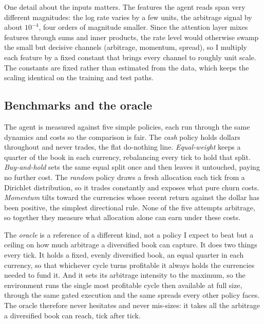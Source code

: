 \documentclass[12pt,a4paper]{article}
\begin{document}
One detail about the inputs matters. The features the agent reads span very different magnitudes:
the log rate varies by a few units, the arbitrage signal by about $10^{-4}$, four orders of
magnitude smaller. Since the attention layer mixes features through sums and inner products, the
rate level would otherwise swamp the small but decisive channels (arbitrage, momentum, spread),
so I multiply each feature by a fixed constant that brings every channel to roughly unit scale.
The constants are fixed rather than estimated from the data, which keeps the scaling identical on
the training and test paths.

\subsection{Benchmarks and the oracle}

The agent is measured against five simple policies, each run through the same dynamics and costs
so the comparison is fair. The \emph{cash} policy holds dollars throughout and never trades, the
flat do-nothing line. \emph{Equal-weight} keeps a quarter of the book in each currency,
rebalancing every tick to hold that split. \emph{Buy-and-hold} sets the same equal split once and
then leaves it untouched, paying no further cost. The \emph{random} policy draws a fresh
allocation each tick from a Dirichlet distribution, so it trades constantly and exposes what pure
churn costs. \emph{Momentum} tilts toward the currencies whose recent return against the dollar
has been positive, the simplest directional rule. None of the five attempts arbitrage, so
together they measure what allocation alone can earn under these costs.

The \emph{oracle} is a reference of a different kind, not a policy I expect to beat but a ceiling
on how much arbitrage a diversified book can capture. It does two things every tick. It holds a
fixed, evenly diversified book, an equal quarter in each currency, so that whichever cycle turns
profitable it always holds the currencies needed to fund it. And it sets its arbitrage intensity
to the maximum, so the environment runs the single most profitable cycle then available at full
size, through the same gated execution and the same spreads every other policy faces. The oracle
therefore never hesitates and never mis-sizes: it takes all the arbitrage a diversified book can
reach, tick after tick.
\end{document}
